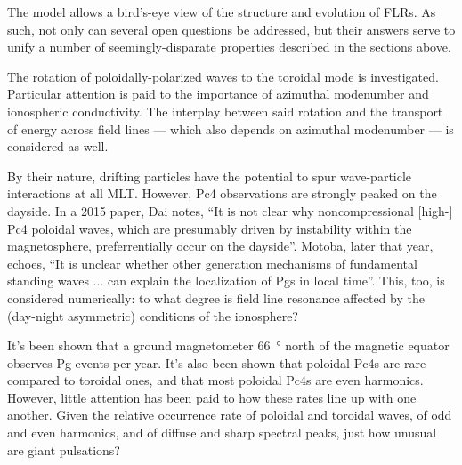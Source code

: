 The model allows a bird's-eye view of the structure and evolution of FLRs. As such, not only can several open questions be addressed, but their answers serve to unify a number of seemingly-disparate properties described in the sections above. 

The rotation of poloidally-polarized waves to the toroidal mode is investigated. Particular attention is paid to the importance of azimuthal modenumber and ionospheric conductivity. The interplay between said rotation and the transport of energy across field lines --- which also depends on azimuthal modenumber --- is considered as well. 

By their nature, drifting particles have the potential to spur wave-particle interactions at all MLT. However, Pc4 observations are strongly peaked on the dayside. In a 2015 paper, Dai notes, ``It is not clear why noncompressional [high-\azm] Pc4 poloidal waves, which are presumably driven by instability within the magnetosphere, preferrentially occur on the dayside''\cite{dai_2015}. Motoba, later that year, echoes, ``It is unclear whether other generation mechanisms of fundamental standing waves ... can explain the localization of Pgs in local time''\cite{motoba_2015}. This, too, is considered numerically: to what degree is field line resonance affected by the (day-night asymmetric) conditions of the ionosphere? 


It's been shown that a ground magnetometer \SI{66}{\degree} north of the magnetic equator observes  Pg events per year. It's also been shown that poloidal Pc4s are rare compared to toroidal ones, and that most poloidal Pc4s are even harmonics. However, little attention has been paid to how these rates line up with one another. Given the relative occurrence rate of poloidal and toroidal waves, of odd and even harmonics, and of diffuse and sharp spectral peaks, just how unusual are giant pulsations? 





